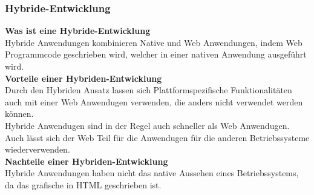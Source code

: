 \documentclass[ngerman]{article}
\begin{document}
    \subsubsection{Hybride-Entwicklung}
    \textbf{Was ist eine Hybride-Entwicklung}\\
    Hybride Anwendungen kombinieren Native und Web Anwendungen, indem Web Programmcode geschrieben wird, welcher in einer nativen Anwendung ausgeführt wird. \cite{Native app vs Web app: Multi-criteria decision-making for optimised mobile solution}\\
    \textbf{Vorteile einer Hybriden-Entwicklung}\\
    Durch den Hybriden Ansatz lassen sich Plattformspezifische Funktionalitäten auch mit einer Web Anwendugen verwenden, die anders nicht verwendet werden können.\\
    Hybride Anwendugen sind in der Regel auch schneller als Web Anwendugen. \cite{Cross-platform development of smartphone applications: An evaluation of React Native}\\
    Auch lässt sich der Web Teil für die Anwendugen für die anderen Betriebssysteme wiederverwenden.\\
    \textbf{Nachteile einer Hybriden-Entwicklung}\\
    Hybride Anwendungen haben nicht das native Aussehen eines Betriebssystems, da das grafische in HTML geschrieben ist.\cite{Cross-platform development of smartphone applications: An evaluation of React Native}
\end{document}
